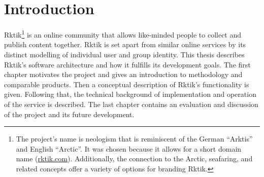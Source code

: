 {}
\setcounter{tocdepth}{2} %
\setcounter{secnumdepth}{3} %
\manualmark
\markboth{\spacedlowsmallcaps{\contentsname}}{\spacedlowsmallcaps{\contentsname}}
\tableofcontents
{}

\renewcommand{\chaptermark}[1]{\markboth{\spacedlowsmallcaps{#1}}{\spacedlowsmallcaps{#1}}}
\renewcommand{\sectionmark}[1]{\markright{\thesection\enspace\spacedlowsmallcaps{#1}}}


\clearpage

\begingroup
    \let\clearpage\relax
    \let\cleardoublepage\relax
    \let\cleardoublepage\relax
    \listoffigures

    \vspace*{8ex}

    

    

\endgroup

\cleardoublepage


\cleardoublepage

\chapter{Introduction}\label{introduction}

Rktik\footnote{The project's name is neologism that is reminiscent of
  the German ``Arktis'' and English ``Arctic''. It was chosen because it
  allows for a short domain name (\url{rktik.com}). Additionally, the
  connection to the Arctic, seafaring, and related concepts offer a
  variety of options for branding Rktik.} is an online community that
allows like-minded people to collect and publish content together. Rktik
is set apart from similar online services by its distinct modelling of
individual user and group identity. This thesis describes Rktik's
software architecture and how it fulfills its development goals. The
first chapter motivates the project and gives an introduction to
methodology and comparable products. Then a conceptual description of
Rktik's functionality is given. Following that, the technical background
of implementation and operation of the service is described. The last
chapter contains an evaluation and discussion of the project and its
future development.

